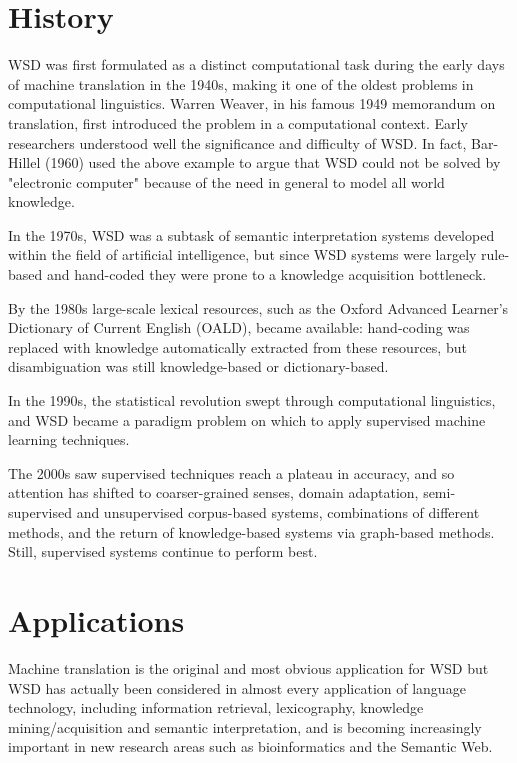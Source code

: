 \documentclass[11pt]{article}
\begin{document}
\section{History}

WSD was first formulated as a distinct computational task during the early days of machine translation in the 1940s, making it one of the oldest problems in computational linguistics. Warren Weaver, in his famous 1949 memorandum on translation, first introduced the problem in a computational context. Early researchers understood well the significance and difficulty of WSD. In fact, Bar-Hillel (1960) used the above example to argue that WSD could not be solved by "electronic computer" because of the need in general to model all world knowledge.

In the 1970s, WSD was a subtask of semantic interpretation systems developed within the field of artificial intelligence, but since WSD systems were largely rule-based and hand-coded they were prone to a knowledge acquisition bottleneck.

By the 1980s large-scale lexical resources, such as the Oxford Advanced Learner's Dictionary of Current English (OALD), became available: hand-coding was replaced with knowledge automatically extracted from these resources, but disambiguation was still knowledge-based or dictionary-based.

In the 1990s, the statistical revolution swept through computational linguistics, and WSD became a paradigm problem on which to apply supervised machine learning techniques.

The 2000s saw supervised techniques reach a plateau in accuracy, and so attention has shifted to coarser-grained senses, domain adaptation, semi-supervised and unsupervised corpus-based systems, combinations of different methods, and the return of knowledge-based systems via graph-based methods. Still, supervised systems continue to perform best.



\section{Applications}

Machine translation is the original and most obvious application for WSD but WSD has actually been considered in almost every application of language technology, including information retrieval, lexicography, knowledge mining/acquisition and semantic interpretation, and is becoming increasingly important in new research areas such as bioinformatics and the Semantic Web.
\end{document}
